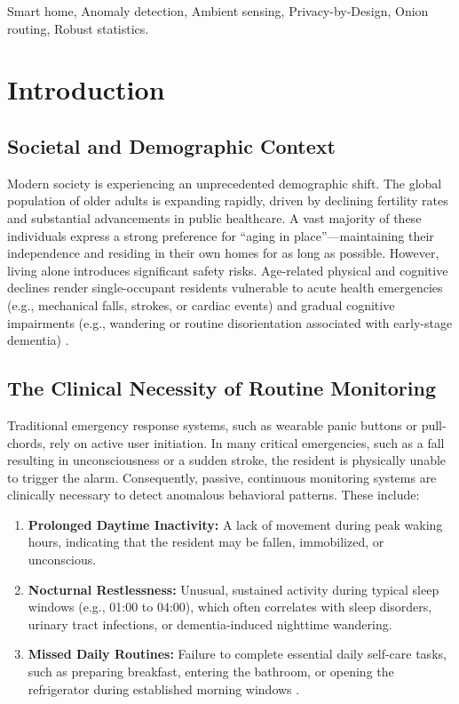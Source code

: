\documentclass[conference]{IEEEtran}
\begin{document}
\begin{IEEEkeywords}
Smart home, Anomaly detection, Ambient sensing, Privacy-by-Design, Onion routing, Robust statistics.
\end{IEEEkeywords}

\section{Introduction}

\subsection{Societal and Demographic Context}
Modern society is experiencing an unprecedented demographic shift. The global population of older adults is expanding rapidly, driven by declining fertility rates and substantial advancements in public healthcare. A vast majority of these individuals express a strong preference for ``aging in place''---maintaining their independence and residing in their own homes for as long as possible. However, living alone introduces significant safety risks. Age-related physical and cognitive declines render single-occupant residents vulnerable to acute health emergencies (e.g., mechanical falls, strokes, or cardiac events) and gradual cognitive impairments (e.g., wandering or routine disorientation associated with early-stage dementia) \cite{cook casas, al-khafajiy iot}.

\subsection{The Clinical Necessity of Routine Monitoring}
Traditional emergency response systems, such as wearable panic buttons or pull-chords, rely on active user initiation. In many critical emergencies, such as a fall resulting in unconsciousness or a sudden stroke, the resident is physically unable to trigger the alarm. Consequently, passive, continuous monitoring systems are clinically necessary to detect anomalous behavioral patterns. These include:
\begin{enumerate}
  \item \textbf{Prolonged Daytime Inactivity:} A lack of movement during peak waking hours, indicating that the resident may be fallen, immobilized, or unconscious.
  \item \textbf{Nocturnal Restlessness:} Unusual, sustained activity during typical sleep windows (e.g., 01:00 to 04:00), which often correlates with sleep disorders, urinary tract infections, or dementia-induced nighttime wandering.
  \item \textbf{Missed Daily Routines:} Failure to complete essential daily self-care tasks, such as preparing breakfast, entering the bathroom, or opening the refrigerator during established morning windows \cite{cook generalized, cook quality}.
\end{enumerate}
\end{document}
